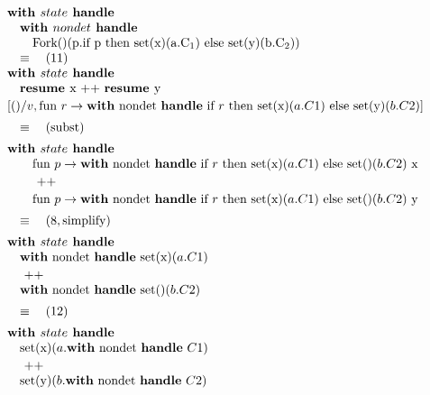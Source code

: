 \documentclass[logo,bsc,singlespacing,parskip]{infthesis}
\begin{document}
\[
\begin{array}{l}
\textbf{with } state \textbf{ handle} \\
\quad\textbf{with } nondet \textbf{ handle} \\
\quad\quad \text{Fork()(p.if p then set(x)(a.C\textsubscript{1}) else set(y)(b.C\textsubscript{2}))}
\\
\quad\equiv\quad (11) \quad \\ 
\textbf{with } state \textbf{ handle} \\
 
\quad\textbf{resume } \text{x} \text{ ++ } \textbf{resume } \text{y} \\[2pt]
[()/v, \text{fun } r \rightarrow \text{\textbf{with} nondet \textbf{handle} if } r \text{ then set(x)}(a.C1) \text{ else set(y)}(b.C2)] \\[5pt]
\quad\equiv\quad (\text{subst}) \\[5pt] 
\textbf{with } state \textbf{ handle} \\
\quad
\quad\text{fun } p \rightarrow \text{\textbf{with} nondet \textbf{handle} if } r \text{ then set(x)}(a.C1) \text{ else set()}(b.C2)\ \text{x} \\[2pt]
\quad \quad \text{ ++ } \\[2pt]
\quad \quad \text{fun } p \rightarrow \text{\textbf{with} nondet \textbf{handle} if } r \text{ then set(x)}(a.C1) \text{ else set()}(b.C2)\ \text{y} \\[5pt]
\quad\equiv\quad (8, \text{simplify}) \\[5pt]
\textbf{with } state \textbf{ handle} \\
  
\quad \text{\textbf{with} nondet \textbf{handle} set(x)}(a.C1) \\[2pt]
\quad\text{ ++ } \\ 
\quad\text{\textbf{with} nondet \textbf{handle} set()}(b.C2) \\[5pt]
\quad\equiv\quad (12) \\[5pt]

\textbf{with } state \textbf{ handle} \\
\quad \text{set(x)}(a.\text{\textbf{with} nondet \textbf{handle} } C1) 
\quad \\[2pt]
\quad \text{ ++ } \\ 
\quad \text{set(y)}(b.\text{\textbf{with} nondet \textbf{handle} } C2) \\[5pt]
 
\end{array}
\]
\end{document}
